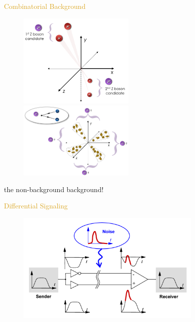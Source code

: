 \begin{frame}{\textcolor{Goldenrod}{Combinatorial Background}}
  \begin{overlayarea}{\textwidth}{\textheight}
    \begin{figure}[h]
      \centering
      \includegraphics[height=0.5\textheight, width=0.5\textwidth]{./Images/103_extra_combinatorial_bkgs_01}
      \includegraphics[height=0.5\textheight, width=0.5\textwidth]{./Images/103_extra_combinatorial_bkgs_02}
    \end{figure}
    
    \itt
  \item the non-background background!
    \tti
  \end{overlayarea}
\end{frame}



\begin{frame}{\textcolor{Goldenrod}{Differential Signaling}}
  \begin{overlayarea}{\textwidth}{\textheight}
    \begin{figure}[h]
      \centering
      \includegraphics[width=0.8\textwidth]{./Images/108_extra_DiffSignaling}
    \end{figure}
    
  \end{overlayarea}
\end{frame}

